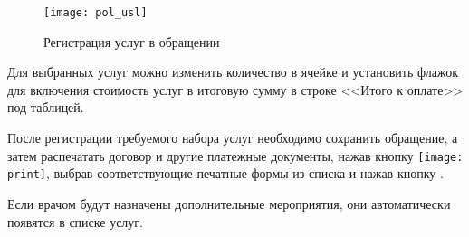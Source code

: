 {\begin{figure}[ht]\centering
	\texttt{[image: pol\_usl]}
	\caption{Регистрация услуг в обращении}
	\label{img_pol_usl}
\end{figure}

Для выбранных услуг можно изменить количество в ячейке  и установить флажок  для включения стоимость услуг в итоговую сумму в строке <<Итого к оплате>> под таблицей. 

После регистрации требуемого набора услуг необходимо сохранить обращение, а затем распечатать договор и другие платежные документы, нажав кнопку \texttt{[image: print]}, выбрав соответствующие печатные формы из списка и нажав кнопку .

\begin{vnim}
Если врачом будут назначены дополнительные мероприятия, они автоматически появятся в списке услуг.
\end{vnim}
}{}

